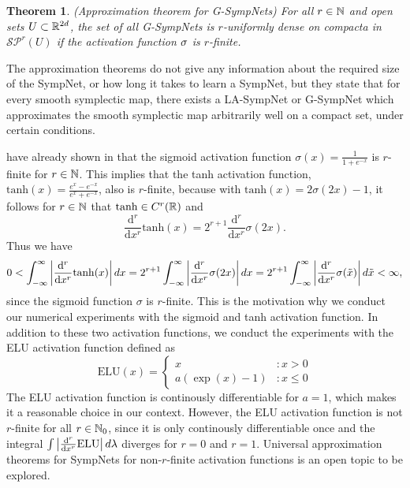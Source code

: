 \documentclass[twoside,a4paper]{article}
\newtheorem{theorem}{Theorem}
\begin{document}
\begin{theorem}
	(Approximation theorem for G-SympNets)
	For all $r \in \mathbb{N}$ and open sets $U \subset \mathbb{R}^{2d}$, the set of all G-SympNets
	is $r$-uniformly dense on compacta in $\mathcal{S}\mathcal{P}^r(U)$ if the activation function
	$\sigma$ is $r$-finite.
\end{theorem}

The approximation theorems do not give any information
about the required size of the SympNet, or how long it takes to learn a SympNet,
but they state that for every smooth symplectic map, there exists a LA-SympNet or G-SympNet
which approximates the smooth symplectic map arbitrarily well on a compact set,
under certain conditions.

\citeauthor{Jin2020} have already shown in \cite[Lemma 1]{Jin2020} that the
sigmoid activation function $\sigma(x) = \frac{1}{1+e^{-x}}$
is $r$-finite for $r \in \mathbb{N}$. This implies that the tanh activation function,
$\mathrm{tanh}(x) = \frac{e^x - e^{-x}}{e^x + e^{-x}}$,
also is $r$-finite, because with $\mathrm{tanh}(x) = 2\sigma(2x) - 1$, it follows for $r \in \mathbb{N}$
that $\mathrm{tanh} \in C^r(\mathbb{R})$ and
\begin{equation*}
	\frac{\mathrm{d}^r}{\mathrm{d}x^r} \mathrm{tanh}(x) = 
	2^{r+1} \frac{\mathrm{d}^r}{\mathrm{d}x^r} \sigma(2x)
	.
\end{equation*}
Thus we have
\begin{equation*}
	0 < \int_{- \infty}^{\infty} \left|{\frac{\mathrm{d}^r}{\mathrm{d}x^r} \mathrm{tanh}(x)}\right| dx
	= 2^{r+1} \int_{- \infty}^{\infty} \left|{\frac{\mathrm{d}^r}{\mathrm{d}x^r} \sigma(2x)}\right| dx
	= 2^{r+1} \int_{- \infty}^{\infty} \left|{\frac{\mathrm{d}^r}{\mathrm{d}x^r} \sigma(\tilde{x})}\right| d\tilde{x}
	< \infty
	,
\end{equation*}
since the sigmoid function $\sigma$ is $r$-finite. This is the motivation why we conduct
our numerical experiments with the sigmoid and tanh activation function. In addition to
these two activation functions, we conduct the experiments with the ELU activation function defined as
\begin{equation*}
	\mathrm{ELU}(x) = \begin{cases}
		x &: x > 0 \\
		a (\exp(x) - 1) &: x \leq 0
	\end{cases}
\end{equation*}
The ELU activation function is continously differentiable for $a=1$,
which makes it a reasonable choice in our context. However, 
the ELU activation function is not $r$-finite for all $r \in \mathbb{N}_0$, since
it is only continously differentiable once and the integral 
$\int \left|{\frac{\mathrm{d}^r}{\mathrm{d}x^r} \mathrm{ELU}}\right| d\lambda$
diverges for $r=0$ and $r=1$. Universal approximation theorems for SympNets
for non-$r$-finite activation functions is an open topic to be explored.
\end{document}
